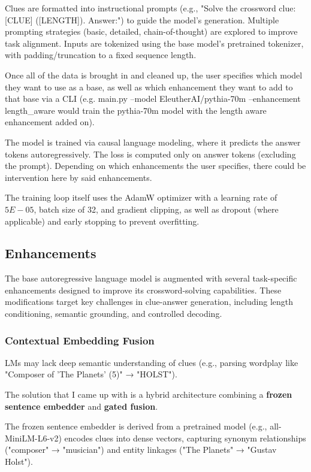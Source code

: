 \documentclass[
	a4paper, %
	10pt, %
	unnumberedsections, %
	twoside, %
]{LTJournalArticle}
\begin{document}
Clues are formatted into instructional prompts (e.g., "Solve the crossword clue: [CLUE] ([LENGTH]). Answer:") to guide the model’s generation. Multiple prompting strategies (basic, detailed, chain-of-thought) are explored to improve task alignment. Inputs are tokenized using the base model’s pretrained tokenizer, with padding/truncation to a fixed sequence length.

Once all of the data is brought in and cleaned up, the user specifies which model they want to use as a base, as well as which enhancement they want to add to that base via a CLI (e.g. main.py --model EleutherAI/pythia-70m --enhancement length\_aware would train the pythia-70m model with the length aware enhancement added on).

The model is trained via causal language modeling, where it predicts the answer tokens autoregressively. The loss is computed only on answer tokens (excluding the prompt). Depending on which enhancements the user specifies, there could be intervention here by said enhancements.

The training loop itself uses  the AdamW optimizer with a learning rate of $5E-05$, batch size of 32, and gradient clipping, as well as dropout (where applicable) and early stopping to prevent overfitting.

\subsection{Enhancements}

The base autoregressive language model is augmented with several task-specific enhancements designed to improve its crossword-solving capabilities. These modifications target key challenges in clue-answer generation, including length conditioning, semantic grounding, and controlled decoding.

\subsubsection{Contextual Embedding Fusion}
LMs may lack deep semantic understanding of clues (e.g., parsing wordplay like "Composer of 'The Planets' (5)" → "HOLST").

The solution that I came up with is a hybrid architecture combining a \textbf{frozen sentence embedder} and \textbf{gated fusion}.

The frozen sentence embedder is derived from a pretrained model (e.g., all-MiniLM-L6-v2) encodes clues into dense vectors, capturing synonym relationships ("composer" → "musician") and entity linkages ("The Planets" → "Gustav Holst").
\end{document}
